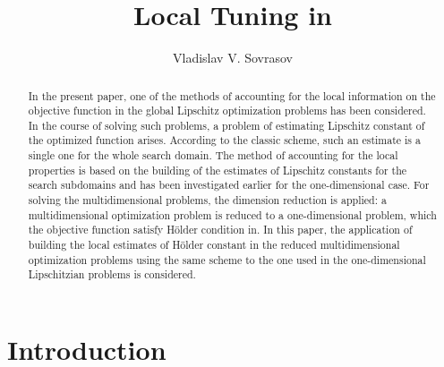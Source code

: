 \documentclass[procedia]{easychair}
\title{Local Tuning in }
\author{
    Vladislav V. Sovrasov%
}
\institute{
  State university of Nizhny Novgorod,
  Nizhny Novgorod, Russia\\
  \email{sovrasov.vlad@gmail.com}
 }
\begin{document}
\maketitle


\begin{abstract}
  In the present paper, one of the methods of accounting for the local information on
  the objective function in the global Lipschitz optimization problems has been considered.
  In the course of solving such problems, a problem of estimating Lipschitz constant of the
  optimized function arises. According to the classic scheme, such an estimate is a single one
  for the whole search domain. The method of accounting for the local properties is based on
  the building of the estimates of Lipschitz constants for the search subdomains and has been
  investigated earlier for the one-dimensional case. For solving the multidimensional problems,
  the dimension reduction is applied: a multidimensional optimization problem is reduced to
  a one-dimensional problem, which the objective function satisfy Hölder condition in.
  In this paper, the application of building the local estimates of Hölder constant in the
  reduced multidimensional optimization problems using the same scheme to the one used
  in the one-dimensional Lipschitzian problems is considered.
\end{abstract}


%
%


\section{Introduction}
\label{sect:introduction}
\end{document}
